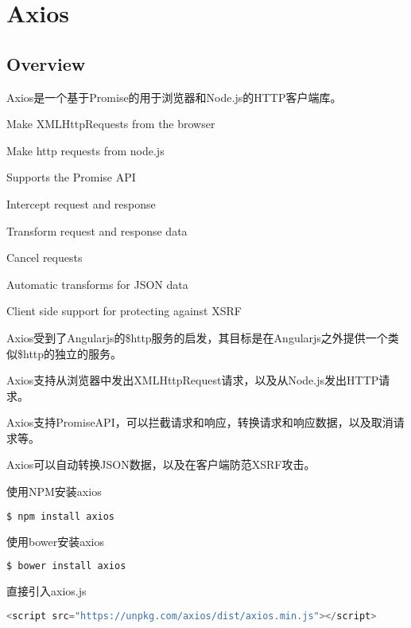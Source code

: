 \part{Axios}


\chapter{Overview}

Axios是一个基于Promise的用于浏览器和Node.js的HTTP客户端库。

\begin{compactitem}
\item Make XMLHttpRequests from the browser
\item Make http requests from node.js
\item Supports the Promise API
\item Intercept request and response
\item Transform request and response data
\item Cancel requests
\item Automatic transforms for JSON data
\item Client side support for protecting against XSRF
\end{compactitem}

Axios受到了Angularjs的\$http服务的启发，其目标是在Angularjs之外提供一个类似\$http的独立的服务。

Axios支持从浏览器中发出XMLHttpRequest请求，以及从Node.js发出HTTP请求。

Axios支持PromiseAPI，可以拦截请求和响应，转换请求和响应数据，以及取消请求等。

Axios可以自动转换JSON数据，以及在客户端防范XSRF攻击。

\begin{compactitem}
\item 使用NPM安装axios

\begin{lstlisting}[language=JavaScript]
$ npm install axios
\end{lstlisting}

\item 使用bower安装axios

\begin{lstlisting}[language=JavaScript]
$ bower install axios
\end{lstlisting}

\item 直接引入axios.js

\begin{lstlisting}[language=JavaScript]
<script src="https://unpkg.com/axios/dist/axios.min.js"></script>
\end{lstlisting}

\end{compactitem}

